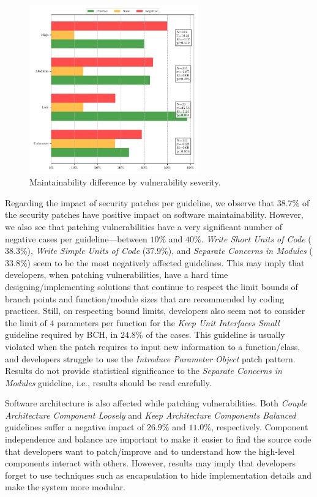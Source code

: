 \documentclass[smallextended]{svjour3}       %
\begin{document}
 \begin{figure}[htp]
  	\centering 	 	\includegraphics[width=0.65\textwidth]{figures/main_per_severity.pdf}
  	\caption{Maintainability difference by vulnerability severity.}
 	\label{fig:severity}
 \end{figure}

 Regarding the impact of security patches per guideline, we 
 observe that $38.7\%$ of the security patches have positive impact
 on software maintainability. However, we also 
 see that patching vulnerabilities have a very significant number of 
 negative cases per guideline---between $10\%$ and $40\%$. 
 \emph{Write Short Units of Code} ($38.3\%$), \emph{Write Simple 
 Units of Code} ($37.9\%$), and \emph{Separate Concerns in Modules} 
 ($33.8\%$) seem to be the most negatively affected guidelines. This 
 may imply that developers, when patching vulnerabilities, have a hard 
 time designing/implementing solutions that continue to respect the 
 limit bounds of branch points and function/module sizes that are 
 recommended by coding practices. Still, on respecting bound limits, 
 developers also seem not to consider the limit of $4$ parameters per 
 function for the \emph{Keep Unit Interfaces Small} guideline 
 required by BCH, in $24.8\%$ of the cases. This guideline is usually
 violated when the patch requires to input new information to a 
 function/class, and developers struggle to use the \emph{Introduce 
 Parameter Object} patch pattern. Results do not provide statistical 
 significance to the \emph{Separate Concerns in Modules} guideline, 
 i.e., results should be read carefully.

Software architecture is also affected while patching 
vulnerabilities. Both \emph{Couple Architecture Component Loosely} 
and \emph{Keep Architecture Components Balanced} guidelines suffer a 
negative impact of $26.9\%$ and $11.0\%$, respectively. Component 
independence and balance are important to make it easier to find the 
source code that developers want to patch/improve and to understand 
how the high-level components interact with others. However, results 
may imply that developers forget to use techniques such as 
encapsulation to hide implementation details and make the system 
more modular.
\end{document}
